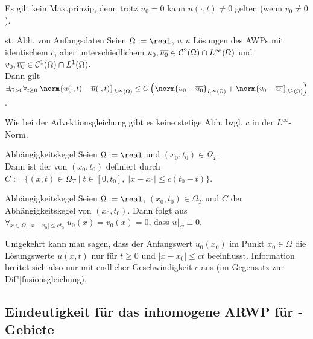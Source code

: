 \begin{Bem}
    Es gilt kein Max.prinzip, denn trotz $u_0 = 0$ kann $u(\cdot, t) \not= 0$ gelten
    (wenn $v_0 \not= 0$).
\end{Bem}

\begin{Satz}{st. Abh. von Anfangsdaten}
    Seien $\Omega := \real$, $u, \overline{u}$ Lösungen des AWPs mit identischem $c$,
    aber unterschiedlichem $u_0, \overline{u_0} \in \mathcal{C}^2(\Omega) \cap L^\infty(\Omega)$ und
    $v_0, \overline{v_0} \in \mathcal{C}^1(\Omega) \cap L^1(\Omega)$.\\
    Dann gilt $\exists_{C > 0} \forall_{t \ge 0}\;
    \norm{u(\cdot, t) - \overline{u}(\cdot, t)}_{L^\infty(\Omega)}
    \le C \left(\norm{u_0 - \overline{u_0}}_{L^\infty(\Omega)} +
    \norm{v_0 - \overline{v_0}}_{L^1(\Omega)}\right)$.
\end{Satz}

\begin{Bem}
    Wie bei der Advektionsgleichung gibt es keine stetige Abh. bzgl. $c$ in der
    $L^\infty$-Norm.
\end{Bem}

\linie

\begin{Def}{Abhängigkeitskegel}
    Seien $\Omega := \real$ und $(x_0, t_0) \in \Omega_T$.\\
    Dann ist der  von $(x_0, t_0)$ definiert
    durch\\
    $C := \{(x, t) \in \Omega_T \;|\; t \in [0, t_0],\; |x - x_0| \le c(t_0 - t)\}$.
\end{Def}

\begin{Satz}{Abhängigkeitskegel}
    Seien $\Omega := \real$, $(x_0, t_0) \in \Omega_T$ und $C$ der Abhängigkeitskegel von
    $(x_0, t_0)$.
    Dann folgt aus $\forall_{x \in \Omega,\, |x - x_0| \le ct_0}\; u_0(x) = v_0(x) = 0$,
    dass $u|_C \equiv 0$.
\end{Satz}

\begin{Bem}
    Umgekehrt kann man sagen, dass der Anfangswert $u_0(x_0)$ im Punkt $x_0 \in \Omega$ die
    Lösungswerte $u(x, t)$ nur für $t \ge 0$ und $|x - x_0| \le ct$ beeinflusst.
    Information breitet sich also nur mit endlicher Geschwindigkeit $c$ aus
    (im Gegensatz zur Dif"|fusionsgleichung).
\end{Bem}

\subsection{%
    Eindeutigkeit für das inhomogene ARWP für -Gebiete%
}

